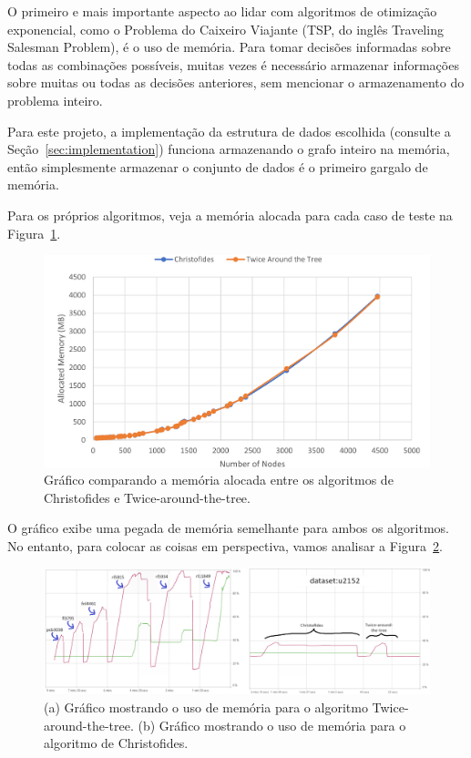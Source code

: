 O primeiro e mais importante aspecto ao lidar com algoritmos de otimização exponencial, como o Problema do Caixeiro Viajante (TSP, do inglês Traveling Salesman Problem), é o uso de memória. Para tomar decisões informadas sobre todas as combinações possíveis, muitas vezes é necessário armazenar informações sobre muitas ou todas as decisões anteriores, sem mencionar o armazenamento do problema inteiro.

Para este projeto, a implementação da estrutura de dados escolhida (consulte a Seção~\ref{sec:implementation}) funciona armazenando o grafo inteiro na memória, então simplesmente armazenar o conjunto de dados é o primeiro gargalo de memória.

Para os próprios algoritmos, veja a memória alocada para cada caso de teste na Figura~\ref{fig:mem_use}.

\begin{figure}[ht]
\centering
\includegraphics[height=.325\textheight]{memory_use_comparison.png}
\caption{Gráfico comparando a memória alocada entre os algoritmos de Christofides e Twice-around-the-tree.}
\label{fig:mem_use}
\end{figure}

O gráfico exibe uma pegada de memória semelhante para ambos os algoritmos. No entanto, para colocar as coisas em perspectiva, vamos analisar a Figura~\ref{fig:memory_behaviour}.

\begin{figure}[ht]
\centering
\includegraphics[width=\textwidth]{memory_profile_comparison.png}
\caption{(a) Gráfico mostrando o uso de memória para o algoritmo Twice-around-the-tree. (b) Gráfico mostrando o uso de memória para o algoritmo de Christofides.}
\label{fig:memory_behaviour}
\end{figure}

